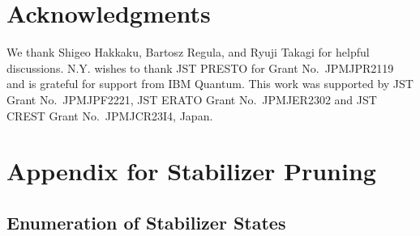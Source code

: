 \documentclass[aps,prx,onecolumn,superscriptaddress,nobibnotes,nofootinbib]{revtex4-2}
\begin{document}
\section*{Acknowledgments}

We thank Shigeo Hakkaku, Bartosz Regula, and Ryuji Takagi for helpful discussions.
N.Y. wishes to thank JST PRESTO for Grant No.\ JPMJPR2119 and is grateful for support from IBM Quantum. This work was supported by JST Grant No.\ JPMJPF2221, JST ERATO Grant No.\ JPMJER2302 and JST CREST Grant No.\ JPMJCR23I4, Japan.



\appendix
\section{Appendix for Stabilizer Pruning}

\subsection{Enumeration of Stabilizer States}
\label{app:enumeration}
\end{document}
